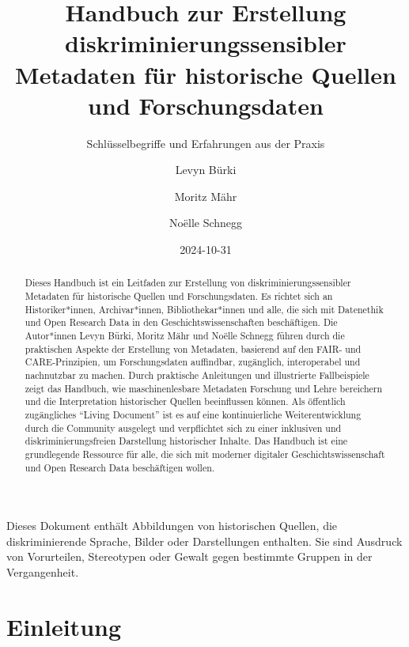 \documentclass[
  letterpaper,
  DIV=11,
  numbers=noendperiod]{scrartcl}
\title{Handbuch zur Erstellung diskriminierungssensibler Metadaten für
historische Quellen und Forschungsdaten}
\subtitle{Schlüsselbegriffe und Erfahrungen aus der Praxis}
\author{Levyn Bürki \and Moritz Mähr \and Noëlle Schnegg}
\date{2024-10-31}
\begin{document}
\maketitle
\begin{abstract}
Dieses Handbuch ist ein Leitfaden zur Erstellung von
diskriminierungssensibler Metadaten für historische Quellen und
Forschungsdaten. Es richtet sich an Historiker*innen, Archivar*innen,
Bibliothekar*innen und alle, die sich mit Datenethik und Open Research
Data in den Geschichtswissenschaften beschäftigen. Die Autor*innen Levyn
Bürki, Moritz Mähr und Noëlle Schnegg führen durch die praktischen
Aspekte der Erstellung von Metadaten, basierend auf den FAIR- und
CARE-Prinzipien, um Forschungsdaten auffindbar, zugänglich,
interoperabel und nachnutzbar zu machen. Durch praktische Anleitungen
und illustrierte Fallbeispiele zeigt das Handbuch, wie maschinenlesbare
Metadaten Forschung und Lehre bereichern und die Interpretation
historischer Quellen beeinflussen können. Als öffentlich zugängliches
``Living Document'' ist es auf eine kontinuierliche Weiterentwicklung
durch die Community ausgelegt und verpflichtet sich zu einer inklusiven
und diskriminierungsfreien Darstellung historischer Inhalte. Das
Handbuch ist eine grundlegende Ressource für alle, die sich mit moderner
digitaler Geschichtswissenschaft und Open Research Data beschäftigen
wollen.
\end{abstract}


\begin{tcolorbox}[enhanced jigsaw, colbacktitle=quarto-callout-warning-color!10!white, rightrule=.15mm, coltitle=black, left=2mm, opacitybacktitle=0.6, toptitle=1mm, title=\textcolor{quarto-callout-warning-color}{\faExclamationTriangle}\hspace{0.5em}{Content Note}, colback=white, colframe=quarto-callout-warning-color-frame, opacityback=0, titlerule=0mm, leftrule=.75mm, breakable, bottomtitle=1mm, bottomrule=.15mm, arc=.35mm, toprule=.15mm]

Dieses Dokument enthält Abbildungen von historischen Quellen, die
diskriminierende Sprache, Bilder oder Darstellungen enthalten. Sie sind
Ausdruck von Vorurteilen, Stereotypen oder Gewalt gegen bestimmte
Gruppen in der Vergangenheit.

\end{tcolorbox}

\section{Einleitung}\label{einleitung}
\end{document}
